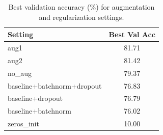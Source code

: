 \begin{table}[!ht]
  \centering
  \small
  \setlength{\tabcolsep}{4pt}
  \caption{Best validation accuracy (\%) for augmentation and regularization settings.}
  \label{tab:net_train_acc}
  \begin{tabular}{lc}
    \toprule
    Setting & Best Val Acc \\
    \midrule
    aug1 & 81.71 \\
    aug2 & 81.42 \\
    no\_aug & 79.37 \\
    baseline+batchnorm+dropout & 76.83 \\
    baseline+dropout & 76.79 \\
    baseline+batchnorm & 76.02 \\
    zeros\_init & 10.00 \\
    \bottomrule
  \end{tabular}
\end{table}

